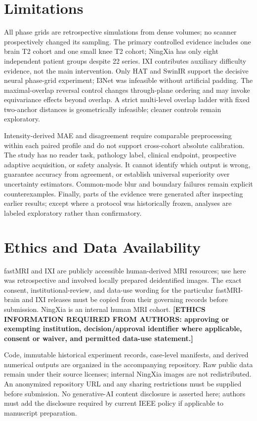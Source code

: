 \documentclass[journal,10pt]{IEEEtran}
\begin{document}
\section{Limitations}
All phase grids are retrospective simulations from dense volumes; no scanner prospectively changed its sampling. The primary controlled evidence includes one brain T2 cohort and one small knee T2 cohort; NingXia has only eight independent patient groups despite 22 series. IXI contributes auxiliary difficulty evidence, not the main intervention. Only HAT and SwinIR support the decisive neural phase-grid experiment; I3Net was infeasible without artificial padding. The maximal-overlap reversal control changes through-plane ordering and may invoke equivariance effects beyond overlap. A strict multi-level overlap ladder with fixed two-anchor distances is geometrically infeasible; cleaner controls remain exploratory.

Intensity-derived MAE and disagreement require comparable preprocessing within each paired profile and do not support cross-cohort absolute calibration. The study has no reader task, pathology label, clinical endpoint, prospective adaptive acquisition, or safety analysis. It cannot identify which output is wrong, guarantee accuracy from agreement, or establish universal superiority over uncertainty estimators. Common-mode blur and boundary failures remain explicit counterexamples. Finally, parts of the evidence were generated after inspecting earlier results; except where a protocol was historically frozen, analyses are labeled exploratory rather than confirmatory.

\section{Ethics and Data Availability}
fastMRI and IXI are publicly accessible human-derived MRI resources; use here was retrospective and involved locally prepared deidentified images. The exact consent, institutional-review, and data-use wording for the particular fastMRI-brain and IXI releases must be copied from their governing records before submission. NingXia is an internal human MRI cohort. \textbf{[ETHICS INFORMATION REQUIRED FROM AUTHORS: approving or exempting institution, decision/approval identifier where applicable, consent or waiver, and permitted data-use statement.]}

Code, immutable historical experiment records, case-level manifests, and derived numerical outputs are organized in the accompanying repository. Raw public data remain under their source licenses; internal NingXia images are not redistributed. An anonymized repository URL and any sharing restrictions must be supplied before submission. No generative-AI content disclosure is asserted here; authors must add the disclosure required by current IEEE policy if applicable to manuscript preparation.
\end{document}
